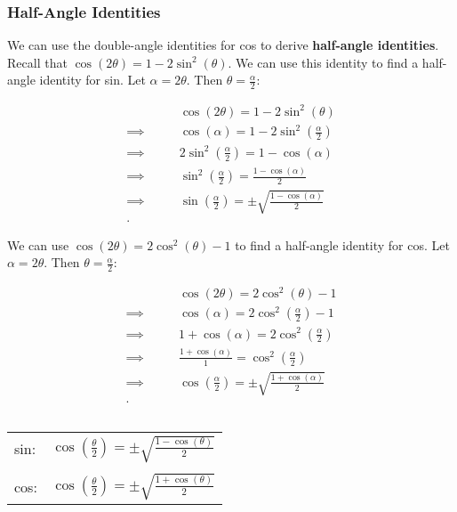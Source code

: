 
\subsubsection*{Half-Angle Identities}
\label{sub_sub_sec:half_angle_identities}

We can use the double-angle identities for cos to derive \textbf{half-angle
identities}. Recall that $\cos (2\theta) = 1 - 2\sin^{2} (\theta)$. We can use
this identity to find a half-angle identity for sin. Let $\alpha = 2\theta$.
Then $\theta = \frac{\alpha}{2}$:

\begin{align*}
  \qquad&\cos (2\theta) = 1 - 2\sin^{2} (\theta) \\
  \implies\qquad&\cos (\alpha) = 1 - 2 \sin^{2} \left(\frac{\alpha}{2}\right) \\
  \implies\qquad&2\sin^{2} \left(\frac{\alpha}{2}\right) = 1 - \cos (\alpha) \\
  \implies\qquad&\sin^{2} \left(\frac{\alpha}{2}\right) = \frac{1 - \cos (\alpha)}{2} \\
  \implies\qquad&\sin \left(\frac{\alpha}{2}\right) = \pm \sqrt{\frac{1 - \cos (\alpha)}{2}} \\
.\end{align*}

We can use $\cos (2\theta) = 2\cos^{2} (\theta) - 1$ to find a half-angle
identity for cos. Let $\alpha = 2\theta$. Then $\theta = \frac{\alpha}{2}$:

\begin{align*}
  \qquad&\cos (2\theta) = 2\cos^{2} (\theta) - 1 \\
  \implies\qquad&\cos (\alpha) = 2\cos^{2} \left(\frac{\alpha}{2}\right) - 1 \\
  \implies\qquad&1 + \cos (\alpha) = 2\cos^{2} \left(\frac{\alpha}{2}\right) \\
  \implies\qquad&\frac{1 + \cos (\alpha)}{1} = \cos^{2} \left(\frac{\alpha}{2}\right) \\
  \implies\qquad&\cos \left(\frac{\alpha}{2}\right) = \pm \sqrt{\frac{1 + \cos (\alpha)}{2}} \\
.\end{align*}

\begin{identity}
  \label{idn:half_angle_identities} $ $

  \begin{tabular}{lr}
    sin: & \(\displaystyle \cos \left(\frac{\theta}{2}\right) = \pm \sqrt{\frac{1 - \cos (\theta)}{2}} \) \\
         & \\
    cos: & \(\displaystyle \cos \left(\frac{\theta}{2}\right) = \pm \sqrt{\frac{1 + \cos (\theta)}{2}} \) \\
  \end{tabular}
\end{identity}


\newpage
